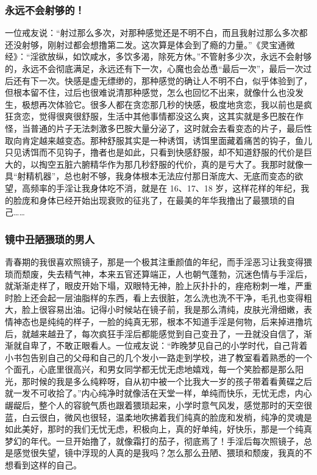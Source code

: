 \subsubsection{永远不会射够的！}

一位戒友说：“射过那么多次，对那种感觉还是不明不白，而且我射过那么多次都还没射够，刚射过都会想撸第二发。这次算是体会到了瘾的力量。”《灵宝通微经》：“淫欲放纵，如饮咸水，多饮多渴，除死方休。”不管射多少次，永远不会射够的，永远不会彻底满足，永远还有下一次，心魔也会怂恿“最后一次”，最后一次过后还有下一次。快感是虚无缥缈的，那种感觉的确让人不明不白，似乎体验到了，但根本留不住，过后也很难说清那种感觉，怎么也回忆不出来，就像什么也没发生，极想再次体验它。很多人都在贪恋那几秒的快感，极度地贪恋，我以前也是疯狂贪恋，觉得很爽很舒服，生活中其他事情都没这么爽，这其实就是多巴胺在作怪，当普通的片子无法刺激多巴胺大量分泌了，这时就会去看变态的片子，最后性取向肯定越来越变态。那种舒服其实是一种诱饵，诱饵里面藏着痛苦的钩子，鱼儿只见诱饵而不见钩子，撸者也是如此，只看到快感舒服，却不知道舒服的代价是巨大的，以掏空五脏六腑精华作为那几秒舒服的代价，真的是亏大了。我那时就像一具“射精机器”，总也射不够，我身体根本无法应付那日渐庞大、无底而变态的欲望，高频率的手淫让我身体吃不消，就是在 16、17、18 岁，这样花样的年纪，我的脸庞和身体已经开始出现衰败的征兆了，在最美的年华我撸出了最猥琐的自己……

\subsubsection{镜中丑陋猥琐的男人}

青春期的我很喜欢照镜子，那是一个极其注重颜值的年纪，而手淫恶习让我变得猥琐而颓废，失去精气神，本来五官还算端正，人也朝气蓬勃，沉迷色情与手淫后，就渐渐走样了，眼皮开始下塌，双眼特无神，脸上灰扑扑的，痤疮粉刺一堆，严重时脸上还会起一层油脂样的东西，看上去很脏，怎么洗也洗不干净，毛孔也变得粗大，脸上很容易出油。记得小时候站在镜子前，我是那么清纯，皮肤光滑细嫩，表情神态也是纯纯的样子，一脸的纯真无邪，根本不知道手淫是何物，后来掉进撸坑后，就越来越丑了，每次疯狂手淫后都能感觉到自己变丑了，一丑就没自信了，渐渐就自卑了，不敢正眼看人。一位戒友说：“昨晚梦见自己的小学时代，自己背着小书包告别自己的父母和自己的几个发小一路走到学校，进了教室看着熟悉的一个个面孔，心底里很高兴，和男女同学都无忧无虑地嬉戏，每一个笑脸都是那么阳光，那时候的我是多么纯粹呀，自从初中被一个比我大一岁的孩子带着看黄碟之后就一发不可收拾了。”内心纯净时就像活在天堂一样，单纯而快乐，无忧无虑，内心龌龊后，整个人的容貌气质也跟着猥琐起来，小学时意气风发，感觉那时的天空很蓝，白云很白，微风也很轻，温柔地吹拂着我们纯真的脸庞和发梢，纯净的灵魂是如此美好，那时的我们无忧无虑，积极向上，真的好单纯，好快乐，那是一个纯真梦幻的年代。一旦开始撸了，就像霜打的茄子，彻底焉了！手淫后每次照镜子，总是感觉很失望，镜中浮现的人真的是我吗？怎么那么丑陋、猥琐和颓废，我真的不想看到这样的自己。

